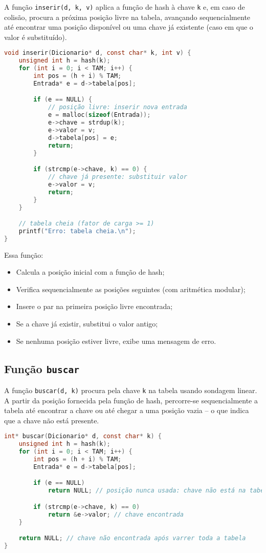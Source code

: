 A função \texttt{inserir(d, k, v)} aplica a função de hash à chave \texttt{k} e, em caso de colisão, procura a próxima posição livre na tabela, avançando sequencialmente até encontrar uma posição disponível ou uma chave já existente (caso em que o valor é substituído).

\begin{lstlisting}[language=C, caption={Inserção com sondagem linear}]
void inserir(Dicionario* d, const char* k, int v) {
    unsigned int h = hash(k);
    for (int i = 0; i < TAM; i++) {
        int pos = (h + i) % TAM;
        Entrada* e = d->tabela[pos];

        if (e == NULL) {
            // posição livre: inserir nova entrada
            e = malloc(sizeof(Entrada));
            e->chave = strdup(k);
            e->valor = v;
            d->tabela[pos] = e;
            return;
        }

        if (strcmp(e->chave, k) == 0) {
            // chave já presente: substituir valor
            e->valor = v;
            return;
        }
    }

    // tabela cheia (fator de carga >= 1)
    printf("Erro: tabela cheia.\n");
}
\end{lstlisting}

Essa função:

\begin{itemize}
  \item Calcula a posição inicial com a função de hash;
  \item Verifica sequencialmente as posições seguintes (com aritmética modular);
  \item Insere o par na primeira posição livre encontrada;
  \item Se a chave já existir, substitui o valor antigo;
  \item Se nenhuma posição estiver livre, exibe uma mensagem de erro.
\end{itemize}

\subsection*{Função \texttt{buscar}}

A função \texttt{buscar(d, k)} procura pela chave \texttt{k} na tabela usando sondagem linear. 
A partir da posição fornecida pela função de hash, percorre-se sequencialmente a tabela até encontrar a chave ou até chegar a uma posição vazia -- o que indica que a chave não está presente.

\begin{lstlisting}[language=C, caption={Busca com sondagem linear}]
int* buscar(Dicionario* d, const char* k) {
    unsigned int h = hash(k);
    for (int i = 0; i < TAM; i++) {
        int pos = (h + i) % TAM;
        Entrada* e = d->tabela[pos];

        if (e == NULL)
            return NULL; // posição nunca usada: chave não está na tabela

        if (strcmp(e->chave, k) == 0)
            return &e->valor; // chave encontrada
    }

    return NULL; // chave não encontrada após varrer toda a tabela
}
\end{lstlisting}

